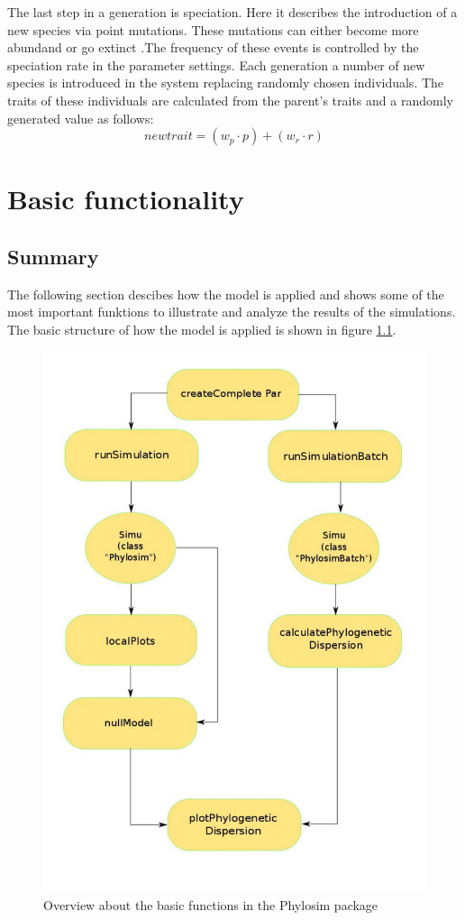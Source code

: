 \documentclass [a4paper]{tufte-book}\usepackage[]{graphicx}\usepackage[]{color}
\begin{document}
The last step in a generation is speciation. Here it describes the introduction of a new species via point mutations. These mutations can either become more abundand or go extinct \citep{hubbell1997}.The frequency of these events is controlled by the speciation rate in the parameter settings. Each generation a number of new species is introduced in the system replacing randomly chosen individuals. The traits of these individuals are calculated from the parent's traits and a randomly generated value as follows:
\begin{equation}
newtrait = (w_p \cdot p) + (w_r \cdot r)
\end{equation}


\chapter{Basic functionality}

\section{Summary}
The following section descibes how the model is applied and shows some of the most important funktions to illustrate and analyze the results of the simulations.\\
The basic structure of how the model is applied is shown in figure \ref{fig: func}.
\begin{figure}[h]
	\centering
	\includegraphics[width=12cm]{flowchart} %
	\caption{Overview about the basic functions in the Phylosim package}\label{fig: func}
\end{figure} 
\FloatBarrier
\end{document}
